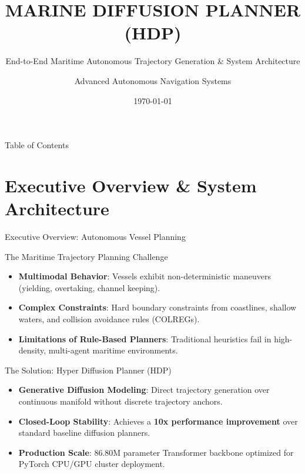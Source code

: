 \documentclass[t]{beamer}
\title[Hyper Diffusion Planner (HDP)]{MARINE DIFFUSION PLANNER (HDP)}
\subtitle{End-to-End Maritime Autonomous Trajectory Generation \& System Architecture}
\author[Data Engineering \& AI Team]{Advanced Autonomous Navigation Systems}
\institute[DeepMind / Jcode]{DeepMind Agentic Coding \& Navigation Engineering}
\date{\today}
\begin{document}
\begin{frame}
    \titlepage
\end{frame}

\begin{frame}{Table of Contents}
    \tableofcontents
\end{frame}

\section{Executive Overview \& System Architecture}

\begin{frame}{Executive Overview: Autonomous Vessel Planning}
    \begin{block}{The Maritime Trajectory Planning Challenge}
        \begin{itemize}
            \item \textbf{Multimodal Behavior}: Vessels exhibit non-deterministic maneuvers (yielding, overtaking, channel keeping).
            \item \textbf{Complex Constraints}: Hard boundary constraints from coastlines, shallow waters, and collision avoidance rules (COLREGs).
            \item \textbf{Limitations of Rule-Based Planners}: Traditional heuristics fail in high-density, multi-agent maritime environments.
        \end{itemize}
    \end{block}

    \begin{alertblock}{The Solution: Hyper Diffusion Planner (HDP)}
        \begin{itemize}
            \item \textbf{Generative Diffusion Modeling}: Direct trajectory generation over continuous manifold without discrete trajectory anchors.
            \item \textbf{Closed-Loop Stability}: Achieves a \textbf{10x performance improvement} over standard baseline diffusion planners.
            \item \textbf{Production Scale}: $86.80\text{M}$ parameter Transformer backbone optimized for PyTorch CPU/GPU cluster deployment.
        \end{itemize}
    \end{alertblock}
\end{frame}
\end{document}
